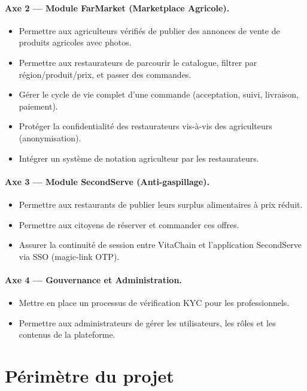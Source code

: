 \documentclass[12pt,a4paper]{report}
\begin{document}
\paragraph{Axe 2 --- Module FarMarket (Marketplace Agricole).}
\begin{itemize}
  \item Permettre aux agriculteurs vérifiés de publier des annonces de vente de produits
        agricoles avec photos.
  \item Permettre aux restaurateurs de parcourir le catalogue, filtrer par
        région/produit/prix, et passer des commandes.
  \item Gérer le cycle de vie complet d'une commande (acceptation, suivi, livraison,
        paiement).
  \item Protéger la confidentialité des restaurateurs vis-à-vis des agriculteurs
        (anonymisation).
  \item Intégrer un système de notation agriculteur par les restaurateurs.
\end{itemize}

\paragraph{Axe 3 --- Module SecondServe (Anti-gaspillage).}
\begin{itemize}
  \item Permettre aux restaurants de publier leurs surplus alimentaires à prix réduit.
  \item Permettre aux citoyens de réserver et commander ces offres.
  \item Assurer la continuité de session entre VitaChain et l'application SecondServe
        via SSO (magic-link OTP).
\end{itemize}

\paragraph{Axe 4 --- Gouvernance et Administration.}
\begin{itemize}
  \item Mettre en place un processus de vérification KYC pour les professionnels.
  \item Permettre aux administrateurs de gérer les utilisateurs, les rôles et les
        contenus de la plateforme.
\end{itemize}

\section{Périmètre du projet}
\end{document}
